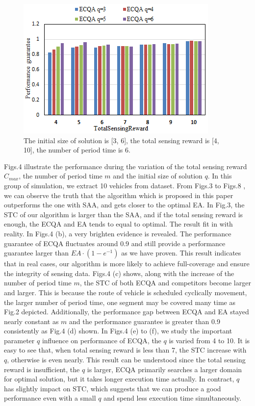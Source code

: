 \documentclass[journal]{IEEEtran}
\begin{document}
\begin{figure}
	\centering
	\includegraphics[width=1\linewidth]{Fig4(f).png}
	\caption{The initial size of solution is [3, 6], the total sensing reward is [4, 10], the number of period time is 6.}
	\label{fig:figure5}
\end{figure}
Figs.4 illustrate the performance during the variation of the total sensing reward $C_{max}$, the number of period time $m$ and the initial size of solution $q$. In this group of simulation, we extract 10 vehicles from dataset. From Figs.3 to Figs.8 , we can observe the truth that the algorithm which is proposed in this paper outperforms the one with SAA, and gets closer to the optimal EA. In Fig.3, the STC of our algorithm is larger than the SAA, and if the total sensing reward is enough, the ECQA and EA tends to equal to optimal. The result fit in with reality. In Figs.4 (b), a very brighten evidence is revealed. The performance guarantee of ECQA fluctuates around 0.9 and still provide a performance guarantee larger than $EA\cdot(1-e^{-1})$ as we have proven. This result indicates that in real cases, our algorithm is more likely to achieve full-coverage and ensure the integrity of sensing data. Figs.4 (c) shows, along with the increase of the number of period time $m$, the STC of both ECQA and competitors become larger and larger. This is because the route of vehicle is scheduled cyclically movement, the larger number of period time, one segment may be covered many time as Fig.2 depicted. Additionally, the performance gap between ECQA and EA stayed nearly constant as $m$ and the performance guarantee is greater than 0.9 consistently as Fig.4 (d) shown. In Figs.4 (e) to (f), we study the important parameter $q$ influence on performance of ECQA, the $q$ is varied from 4 to 10. It is easy to see that, when total sensing reward is less than 7, the STC increase with $q$, otherwise is even nearly. This result can be understood since the total sensing reward is insufficient, the $q$ is larger, ECQA primarily searches a larger domain for optimal solution, but it takes longer execution time actually. In contract, $q$ has slightly impact on STC, which suggests that we can produce a good performance even with a small $q$ and spend less execution time simultaneously. 
\end{document}
